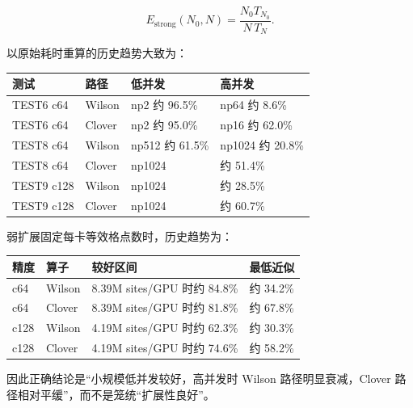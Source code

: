\documentclass[UTF8,a4paper,10pt]{ctexart}
\begin{document}
\begin{displaymath}
E_{\mathrm{strong}}(N_0,N) = \frac{N_0T_{N_0}}{N\,T_N}.
\end{displaymath}

以原始耗时重算的历史趋势大致为：

\begin{center}\small
\setlength{\tabcolsep}{2pt}
\begin{longtable}{@{}>{\raggedright\arraybackslash}p{}>{\raggedright\arraybackslash}p{}>{\raggedright\arraybackslash}p{}>{\raggedright\arraybackslash}p{}@{}}
\toprule
\textbf{测试} & \textbf{路径} & \textbf{低并发} & \textbf{高并发} \\
\midrule\endhead
TEST6 c64 & Wilson & np2 约 96.5\% & np64 约 8.6\% \\
TEST6 c64 & Clover & np2 约 95.0\% & np16 约 62.0\% \\
TEST8 c64 & Wilson & np512 约 61.5\% & np1024 约 20.8\% \\
TEST8 c64 & Clover & np1024 & 约 51.4\% \\
TEST9 c128 & Wilson & np1024 & 约 28.5\% \\
TEST9 c128 & Clover & np1024 & 约 60.7\% \\
\bottomrule\end{longtable}
\end{center}
弱扩展固定每卡等效格点数时，历史趋势为：

\begin{center}\small
\setlength{\tabcolsep}{2pt}
\begin{longtable}{@{}>{\raggedright\arraybackslash}p{}>{\raggedright\arraybackslash}p{}>{\raggedright\arraybackslash}p{}>{\raggedright\arraybackslash}p{}@{}}
\toprule
\textbf{精度} & \textbf{算子} & \textbf{较好区间} & \textbf{最低近似} \\
\midrule\endhead
c64 & Wilson & 8.39M sites/GPU 时约 84.8\% & 约 34.2\% \\
c64 & Clover & 8.39M sites/GPU 时约 81.8\% & 约 67.8\% \\
c128 & Wilson & 4.19M sites/GPU 时约 62.3\% & 约 30.3\% \\
c128 & Clover & 4.19M sites/GPU 时约 74.6\% & 约 58.2\% \\
\bottomrule\end{longtable}
\end{center}
因此正确结论是“小规模低并发较好，高并发时 Wilson 路径明显衰减，Clover 路径相对平缓”，而不是笼统“扩展性良好”。
\end{document}
